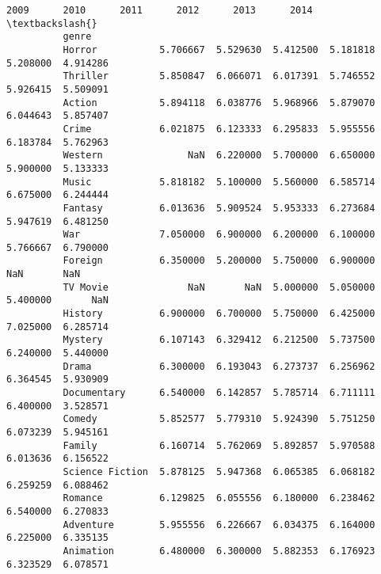 \documentclass[11pt]{article}
\begin{document}
\begin{Verbatim}[commandchars=\\\{\}]
                               2009      2010      2011      2012      2013      2014  \textbackslash{}
          genre                                                                         
          Horror           5.706667  5.529630  5.412500  5.181818  5.208000  4.914286   
          Thriller         5.850847  6.066071  6.017391  5.746552  5.926415  5.509091   
          Action           5.894118  6.038776  5.968966  5.879070  6.044643  5.857407   
          Crime            6.021875  6.123333  6.295833  5.955556  6.183784  5.762963   
          Western               NaN  6.220000  5.700000  6.650000  5.900000  5.133333   
          Music            5.818182  5.100000  5.560000  6.585714  6.675000  6.244444   
          Fantasy          6.013636  5.909524  5.953333  6.273684  5.947619  6.481250   
          War              7.050000  6.900000  6.200000  6.100000  5.766667  6.790000   
          Foreign          6.350000  5.200000  5.750000  6.900000       NaN       NaN   
          TV Movie              NaN       NaN  5.000000  5.050000  5.400000       NaN   
          History          6.900000  6.700000  5.750000  6.425000  7.025000  6.285714   
          Mystery          6.107143  6.329412  6.212500  5.737500  6.240000  5.440000   
          Drama            6.300000  6.193043  6.273737  6.256962  6.364545  5.930909   
          Documentary      6.540000  6.142857  5.785714  6.711111  6.400000  3.528571   
          Comedy           5.852577  5.779310  5.924390  5.751250  6.073239  5.945161   
          Family           6.160714  5.762069  5.892857  5.970588  6.013636  6.156522   
          Science Fiction  5.878125  5.947368  6.065385  6.068182  6.259259  6.088462   
          Romance          6.129825  6.055556  6.180000  6.238462  6.540000  6.270833   
          Adventure        5.955556  6.226667  6.034375  6.164000  6.225000  6.335135   
          Animation        6.480000  6.300000  5.882353  6.176923  6.323529  6.078571   
          

\end{Verbatim}
\end{document}
